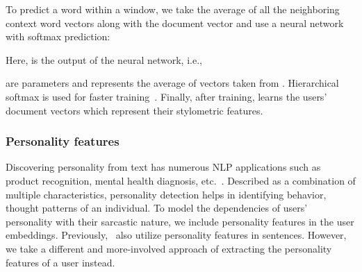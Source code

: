 \documentclass[11pt]{article}
\begin{document}
To predict a word within a window, we take the average of all the neighboring context word vectors along with the document vector  and use a neural network with softmax prediction: 

Here,  is the output of the neural network, i.e.,

 are parameters and  represents the average of vectors  taken from . Hierarchical softmax is used for faster training~\cite{morin2005hierarchical}. Finally, after training,  learns the users' document vectors which represent their stylometric features.




\subsubsection{Personality features} \label{sec:personality}

Discovering personality from text has numerous NLP applications such as product recognition, mental health diagnosis, etc.~\cite{majumder2017deep}. Described as a combination of multiple characteristics, personality detection helps in identifying behavior, thought patterns of an individual. To model the dependencies of users' personality with their sarcastic nature, we include personality features in the user embeddings.
Previously,~ also utilize personality features in sentences. However, we take a different and more-involved approach of extracting the personality features of a user instead.
\end{document}

